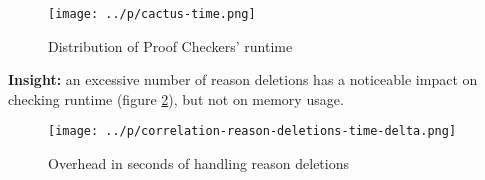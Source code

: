 \documentclass[final,hyperref={pdfpagelabels=true}]{beamer}
\begin{document}
\begin{frame}[fragile]
\begin{columns}[t]
\begin{column}{.45\textwidth}
    \begin{figure}
        \centering
        \caption{Distribution of Proof Checkers' runtime\label{fig:cactus-time}}
        \texttt{[image: ../p/cactus-time.png]}
    \end{figure}

    \textbf{Insight:} an excessive number of reason deletions
    has a noticeable impact on checking runtime (figure
    \ref{fig:correlation-reason-deletions-time-delta}), but not on memory usage.
    \vspace{1cm}

    \begin{figure}
        \centering
        \caption{Overhead in seconds of handling reason deletions\label{fig:correlation-reason-deletions-time-delta}}
        \texttt{[image: ../p/correlation-reason-deletions-time-delta.png]}
    \end{figure}

    \end{column}
  \end{columns}
\end{frame}
\end{document}

